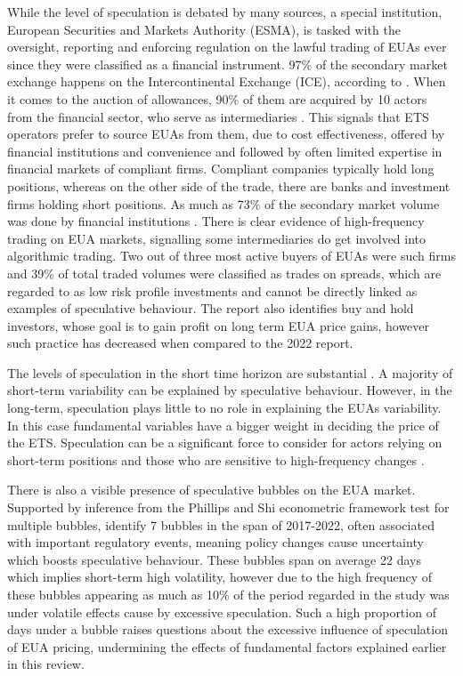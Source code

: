 \documentclass[12pt, letterpaper]{article}
\begin{document}
While the level of speculation is debated by many sources, a special institution, European Securities and Markets Authority (ESMA), is tasked with the oversight, reporting and enforcing regulation on the lawful trading of EUAs ever since they were classified as a financial instrument. 97\% of the secondary market exchange happens on the Intercontinental Exchange (ICE), according to \textcite{icis2020}. When it comes to the auction of allowances, 90\% of them are acquired by 10 actors from the financial sector, who serve as intermediaries \parencite{esma2024}. This signals that ETS operators prefer to source EUAs from them, due to cost effectiveness, offered by financial institutions and convenience and followed by often limited expertise in financial markets of compliant firms. Compliant companies typically hold long positions, whereas on the other side of the trade, there are banks and investment firms holding short positions. As much as 73\% of the secondary market volume was done by financial institutions \parencite{esma2024}. There is clear evidence of high-frequency trading on EUA markets, signalling some intermediaries do get involved into algorithmic trading. Two out of three most active buyers of EUAs were such firms and 39\% of total traded volumes were classified as trades on spreads, which are regarded to as low risk profile investments and cannot be directly linked as examples of speculative behaviour. The report also identifies buy and hold investors, whose goal is to gain profit on long term EUA price gains, however such practice has decreased when compared to the 2022 report.

The levels of speculation in the short time horizon are substantial \parencite{lovcha2021}. A majority of short-term variability can be explained by speculative behaviour. However, in the long-term, speculation plays little to no role in explaining the EUAs variability. In this case fundamental variables have a bigger weight in deciding the price of the ETS. Speculation can be a significant force to consider for actors relying on short-term positions and those who are sensitive to high-frequency changes \parencite{lovcha2021}.

There is also a visible presence of speculative bubbles on the EUA market. Supported by inference from the Phillips and Shi econometric framework test for multiple bubbles, \textcite{terranova2024} identify 7 bubbles in the span of 2017-2022, often associated with important regulatory events, meaning policy changes cause uncertainty which boosts speculative behaviour. These bubbles span on average 22 days which implies short-term high volatility, however due to the high frequency of these bubbles appearing as much as 10\% of the period regarded in the study was under volatile effects cause by excessive speculation. Such a high proportion of days under a bubble raises questions about the excessive influence of speculation of EUA pricing, undermining the effects of fundamental factors explained earlier in this review.
\end{document}
